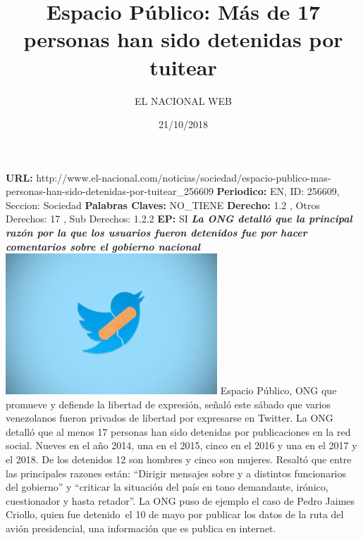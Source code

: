 \documentclass{article}%
\title{\textbf{Espacio Público: Más de 17 personas han sido detenidas por tuitear}}%
\author{EL NACIONAL WEB}%
\date{21/10/2018}%
\begin{document}
%
\normalsize%
\maketitle%
\textbf{URL: }%
http://www.el{-}nacional.com/noticias/sociedad/espacio{-}publico{-}mas{-}personas{-}han{-}sido{-}detenidas{-}por{-}tuitear\_256609\newline%
%
\textbf{Periodico: }%
EN, %
ID: %
256609, %
Seccion: %
Sociedad\newline%
%
\textbf{Palabras Claves: }%
NO\_TIENE\newline%
%
\textbf{Derecho: }%
1.2%
, Otros Derechos: %
17%
, Sub Derechos: %
1.2.2%
\newline%
%
\textbf{EP: }%
SI\newline%
\newline%
%
\textbf{\textit{La ONG detalló que la principal razón por la que los usuarios fueron detenidos fue por hacer comentarios sobre el gobierno nacional~}}%
\newline%
\newline%
%
\includegraphics[width=300px]{52.jpg}%
\newline%
%
Espacio Público, ONG que promueve y defiende la libertad de expresión, señaló este sábado que varios venezolanos fueron privados de libertad por expresarse en Twitter.%
\newline%
%
La ONG detalló que al menos 17 personas han sido detenidas por publicaciones en la red social. Nueves en el año 2014, una en el 2015, cinco en el 2016 y una en el 2017 y el 2018. De los detenidos 12 son hombres y cinco son mujeres.%
\newline%
%
Resaltó que entre las principales razones están: “Dirigir mensajes sobre y a distintos funcionarios del gobierno” y “criticar la situación del país en tono demandante, irónico, cuestionador y hasta retador”.%
\newline%
%
La ONG puso de ejemplo el caso de Pedro Jaimes Criollo, quien fue detenido~el 10 de mayo por publicar los datos de la ruta del avión presidencial, una información que es publica en internet.%
\newline%
%
\end{document}
